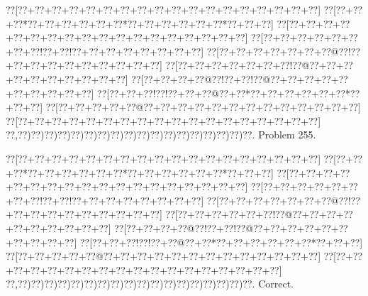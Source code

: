 \documentclass[a5paper]{article}
\begin{document}
\begin{center}
{\goo
\0??[\0??+\0??+\0??+\0??+\0??+\0??+\0??+\0??+\0??+\0??+\0??+\0??+\0??+\0??+\0??+\0??+\0??+\0??]
\0??[\0??+\0??+\0??*\0??+\0??+\0??+\0??+\0??+\0??*\0??+\0??+\0??+\0??+\0??+\0??*\0??+\0??+\0??]
\0??[\0??+\0??+\0??+\0??+\0??+\0??+\0??+\0??+\0??+\0??+\0??+\0??+\0??+\0??+\0??+\0??+\0??+\0??]
\0??[\0??+\0??+\0??+\0??+\0??+\0??+\0??+\0??!\0??+\0??!\0??+\0??+\0??+\0??+\0??+\0??+\0??+\0??]
\0??[\0??+\0??+\0??+\0??+\0??+\0??+\0??@\0??!\0??+\0??+\0??+\0??+\0??+\0??+\0??+\0??+\0??+\0??]
\0??[\0??+\0??+\0??+\0??+\0??+\0??+\0??!\0??@\0??+\0??+\0??+\0??+\0??+\0??+\0??+\0??+\0??+\0??]
\0??[\0??+\0??+\0??+\0??@\0??!\0??+\0??!\0??@\0??+\0??+\0??+\0??+\0??+\0??+\0??+\0??+\0??+\0??]
\0??[\0??+\0??+\0??!\0??!\0??+\0??+\0??@\0??+\0??*\0??+\0??+\0??+\0??+\0??+\0??*\0??+\0??+\0??]
\0??[\0??+\0??+\0??+\0??+\0??@\0??+\0??+\0??+\0??+\0??+\0??+\0??+\0??+\0??+\0??+\0??+\0??+\0??]
\0??[\0??+\0??+\0??+\0??+\0??+\0??+\0??+\0??+\0??+\0??+\0??+\0??+\0??+\0??+\0??+\0??+\0??+\0??]
\0??,\0??)\0??)\0??)\0??)\0??)\0??)\0??)\0??)\0??)\0??)\0??)\0??)\0??)\0??)\0??)\0??)\0??)\0??.
}
Problem 255.

\end{center}
\begin{center}
{\goo
\0??[\0??+\0??+\0??+\0??+\0??+\0??+\0??+\0??+\0??+\0??+\0??+\0??+\0??+\0??+\0??+\0??+\0??+\0??]
\0??[\0??+\0??+\0??*\0??+\0??+\0??+\0??+\0??+\0??*\0??+\0??+\0??+\0??+\0??+\0??*\0??+\0??+\0??]
\0??[\0??+\0??+\0??+\0??+\0??+\0??+\0??+\0??+\0??+\0??+\0??+\0??+\0??+\0??+\0??+\0??+\0??+\0??]
\0??[\0??+\0??+\0??+\0??+\0??+\0??+\0??+\0??!\0??+\0??!\0??+\0??+\0??+\0??+\0??+\0??+\0??+\0??]
\0??[\0??+\0??+\0??+\0??+\0??+\0??+\0??@\0??!\0??+\0??+\0??+\0??+\0??+\0??+\0??+\0??+\0??+\0??]
\0??[\0??+\0??+\0??+\0??+\0??+\0??!\0??@\0??+\0??+\0??+\0??+\0??+\0??+\0??+\0??+\0??+\0??]
\0??[\0??+\0??+\0??+\0??@\0??!\0??+\0??!\0??@\0??+\0??+\0??+\0??+\0??+\0??+\0??+\0??+\0??+\0??]
\0??[\0??+\0??+\0??!\0??!\0??+\0??@\0??+\0??*\0??+\0??+\0??+\0??+\0??+\0??*\0??+\0??+\0??]
\0??[\0??+\0??+\0??+\0??+\0??@\0??+\0??+\0??+\0??+\0??+\0??+\0??+\0??+\0??+\0??+\0??+\0??+\0??]
\0??[\0??+\0??+\0??+\0??+\0??+\0??+\0??+\0??+\0??+\0??+\0??+\0??+\0??+\0??+\0??+\0??+\0??+\0??]
\0??,\0??)\0??)\0??)\0??)\0??)\0??)\0??)\0??)\0??)\0??)\0??)\0??)\0??)\0??)\0??)\0??)\0??)\0??.
}
Correct. 

\end{center}
\end{document}
